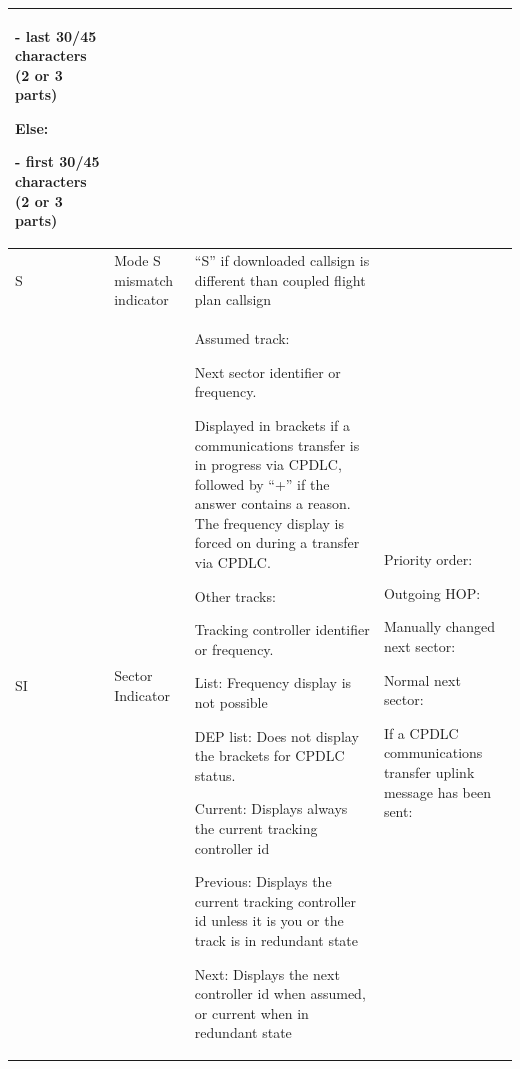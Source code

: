 \documentclass[11pt,a4paper]{memoir}
\newcounter{rowcounter}
\newcommand{\nextrow}{\refstepcounter{rowcounter}}
\newcommand{\colorref}[1]{\textit{\hyperref[#1]{\StrDel{#1}{color:}}}}
\begin{document}
\begin{longtable}{|p{2.5cm}|p{2.5cm}|p{4.5cm}|p{4.5cm}|}
      - last 30/45 characters (2 or 3 parts) 
      \bigskip
      
      Else: 
      
      - first 30/45 characters (2 or 3 parts) &
       \\ \hline
    S \nextrow \label{tag:S}&
      Mode S mismatch indicator &
      “S” if downloaded callsign is different than coupled flight plan callsign &
      \colorref{color:Warning} \\ \hline
    SI \nextrow \label{tag:SI}&
      Sector Indicator &
      Assumed track: 
      
      Next sector identifier or frequency.  
      \bigskip
      
      Displayed in brackets if a  communications transfer is in  progress via CPDLC, followed by “+”  if the answer contains a reason. The frequency  display is forced on during a  transfer via CPDLC. 
      \bigskip
      
      Other tracks: 
      
      Tracking controller identifier or  frequency. 
      \bigskip
      
      List: Frequency display is not possible 
      \bigskip
      
      DEP list: Does not display the  brackets for CPDLC status. 
      \bigskip
      
      Current: Displays always the  current tracking controller id 
      \bigskip
      
      Previous: Displays the current tracking controller id unless it is you or the track is in redundant state 
      \bigskip
      
      Next: Displays the next controller id when assumed, or current when in redundant state &
      Priority order: 
      \bigskip
      
      Outgoing HOP: 
      
      \colorref{color:Proposition In} 
      \bigskip
      
      Manually changed next sector: 
      
      \colorref{color:Warning} 
      \bigskip
      
      Normal next sector:
      
      \colorref{color:Coordination} 
      \bigskip
      
      If a CPDLC communications transfer uplink message has been sent:  
      
      \colorref{color:CPDLC UM Clearance} 
      \bigskip
      

\end{longtable}
\end{document}

